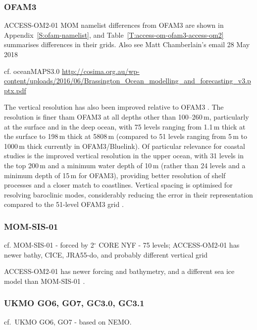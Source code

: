 \documentclass[11pt]{article}
\begin{document}
\subsubsection{OFAM3}

ACCESS-OM2-01 MOM namelist differences from OFAM3 are shown in Appendix~\ref{S:ofam-namelist}, and Table~\ref{T:access-om-ofam3-access-om2} summarises differences in their grids.
Also see Matt Chamberlain's email 28 May 2018

cf. oceanMAPS3.0  \url{http://cosima.org.au/wp-content/uploads/2016/06/Brassington_Ocean_modelling_and_forecasting_v3.pptx.pdf} %

The vertical resolution has also been improved relative to OFAM3 \citep{OkeETAL2013a}. 
The resolution is finer tham OFAM3 at all depths other than 100--260\,m, particularly at the surface and in the deep ocean, with 75 levels ranging from 1.1\,m thick at the surface to 198\,m thick at 5808\,m (compared to 51 levels ranging from 5\,m to 1000\,m thick currently in OFAM3/Bluelink). 
Of particular relevance for coastal studies is the improved vertical resolution in the upper ocean, with 31 levels in the top 200\,m and a minimum water depth of 10\,m (rather than 24 levels and a minimum depth of 15\,m for OFAM3), providing better resolution of shelf processes and a closer match to coastlines. 
Vertical spacing is optimised for resolving baroclinic modes, considerably reducing the error in their representation compared to the 51-level OFAM3 grid \citep[][ table~1]{StewartHoggGriffiesHeerdegenWardSpenceEngland2017a}.

\citet{FengZhangOkeMonselesanChamberlainMatearSchiller2016a}

\subsubsection{MOM-SIS-01}
cf. MOM-SIS-01 \citet{SpenceHolmesHoggGriffiesStewartEngland2017a} - forced by 2$^\circ$ CORE NYF - 75 levels; ACCESS-OM2-01 has newer bathy, CICE, JRA55-do, and probably different vertical grid

ACCESS-OM2-01 has newer forcing and bathymetry, and a different sea ice model than MOM-SIS-01 \cite{SpenceHolmesHoggGriffiesStewartEngland2017a}.

\subsubsection{UKMO GO6, GO7, GC3.0, GC3.1}
cf.\ UKMO GO6, GO7 \citet{StorkeyBlakerMathiotMegannAksenovBlockleyCalvertGrahamHewitt2018a} - based on NEMO.
\end{document}
